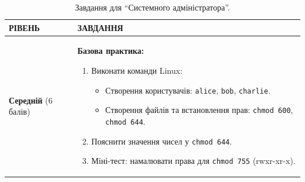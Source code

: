 \begin{table}[h!]
\caption{Завдання для ``Системного адміністратора''.}
\label{tab:lesson4_tech_task} %
\noindent %

\begin{tabular}{
  | >{\raggedright\arraybackslash}p{} 
  | >{\raggedright\arraybackslash}p{} |
}
\hline

\rowcolor{TableHeaderBlue}
\hfil\color{white}\textbf{РІВЕНЬ} & 
\hfil\color{white}\textbf{ЗАВДАННЯ} \\ \hline

\cellcolor{TableBodyGreen}
\textbf{Середній} (6 балів) &
\textbf{Базова практика:}
\begin{enumerate}
    \item Виконати команди Linux:
    \begin{itemize}
        \item Створення користувачів: \texttt{alice}, \texttt{bob}, \texttt{charlie}. \vspace{-0.5em}
        \item Створення файлів та встановлення прав: \texttt{chmod 600}, \texttt{chmod 644}. \vspace{-0.5em}
    \end{itemize}
    \item Пояснити значення чисел у \texttt{chmod 644}.
    \item Міні-тест: намалювати права для \texttt{chmod 755} (rwxr-xr-x).
\end{enumerate}
\\ \hline


\end{tabular}
\end{table}
